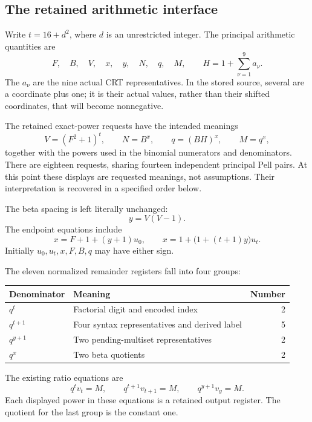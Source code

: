 \subsection{The retained arithmetic interface}

Write \(t=16+d^2\), where \(d\) is an unrestricted integer. The principal
arithmetic quantities are
\[
 F,\quad B,\quad V,\quad x,\quad y,\quad N,\quad q,\quad
 M,\qquad H=1+\sum_{\nu=1}^{9}a_\nu.
\]
The \(a_\nu\) are the nine actual CRT representatives. In the stored source,
several are a coordinate plus one; it is their actual values, rather than
their shifted coordinates, that will become nonnegative.

The retained exact-power requests have the intended meanings
\begin{equation}\label{eq:power-meanings}
 V=(F^2+1)^t,\qquad N=B^x,\qquad q=(BH)^x,\qquad M=q^x,
\end{equation}
together with the powers used in the binomial numerators and denominators.
There are eighteen requests, sharing fourteen independent principal Pell
pairs. At this point these displays are requested meanings, not assumptions.
Their interpretation is recovered in a specified order below.

The beta spacing is left literally unchanged:
\begin{equation}\label{eq:beta}
 y=V(V-1).
\end{equation}
The endpoint equations include
\begin{equation}\label{eq:endpoints}
 x=F+1+(y+1)u_0,\qquad
 x=1+\bigl(1+(t+1)y\bigr)u_t.
\end{equation}
Initially \(u_0,u_t,x,F,B,q\) may have either sign.

The eleven normalized remainder registers fall into four groups:
\begin{center}
\begin{tabular}{llr}
\hline
Denominator & Meaning & Number\\
\hline
\(q^t\) & Factorial digit and encoded index &2\\
\(q^{t+1}\) & Four syntax representatives and derived label &5\\
\(q^{y+1}\) & Two pending-multiset representatives &2\\
\(q^x\) & Two beta quotients &2\\
\hline
\end{tabular}
\end{center}
The existing ratio equations are
\begin{equation}\label{eq:ratios}
 q^t v_t=M,\qquad q^{t+1}v_{t+1}=M,\qquad
 q^{y+1}v_y=M.
\end{equation}
Each displayed power in these equations is a retained output register.
The quotient for the last group is the constant one.

